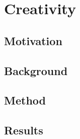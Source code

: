 \chapter{Creativity}
\label{chap:creativity}

\section{Motivation}
\section{Background}
\section{Method}
\section{Results}